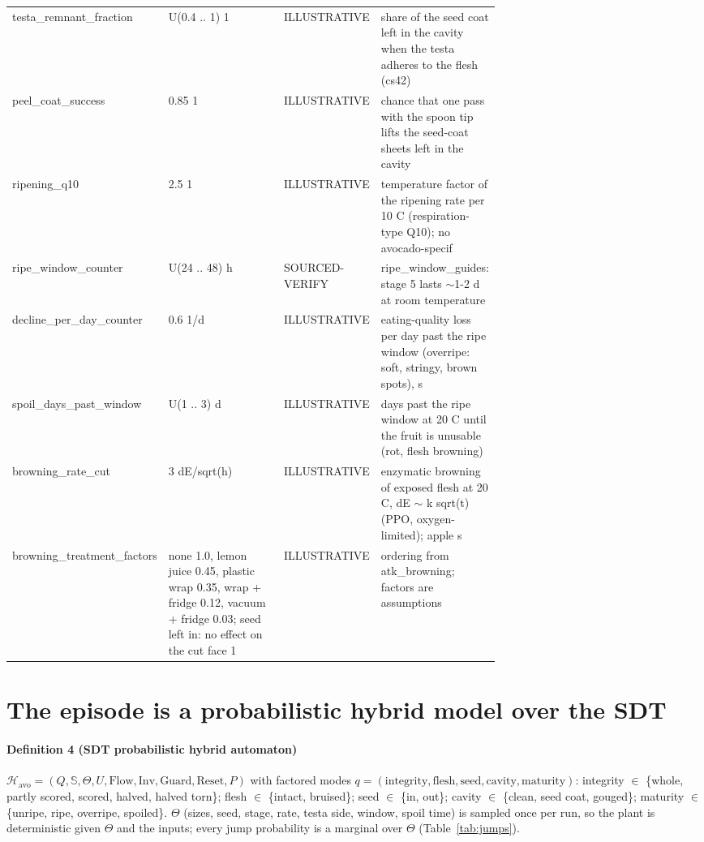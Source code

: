 \documentclass[10.5pt,a4paper]{article}
\begin{document}
\begin{table}[htbp]
\begin{tabularx}{\linewidth}{@{}p{0.25\linewidth}p{0.32\linewidth}p{0.13\linewidth}X@{}}
testa\_remnant\_fraction & U(0.4 .. 1) 1 & ILLUSTRATIVE & share of the seed coat left in the cavity when the testa adheres to the flesh (cs42) \\
peel\_coat\_success & 0.85 1 & ILLUSTRATIVE & chance that one pass with the spoon tip lifts the seed-coat sheets left in the cavity \\
ripening\_q10 & 2.5 1 & ILLUSTRATIVE & temperature factor of the ripening rate per 10 C (respiration-type Q10); no avocado-specif \\
ripe\_window\_counter & U(24 .. 48) h & SOURCED-VERIFY & ripe\_window\_guides: stage 5 lasts $\sim$1-2 d at room temperature \\
decline\_per\_day\_counter & 0.6 1/d & ILLUSTRATIVE & eating-quality loss per day past the ripe window (overripe: soft, stringy, brown spots), s \\
spoil\_days\_past\_window & U(1 .. 3) d & ILLUSTRATIVE & days past the ripe window at 20 C until the fruit is unusable (rot, flesh browning) \\
browning\_rate\_cut & 3 dE/sqrt(h) & ILLUSTRATIVE & enzymatic browning of exposed flesh at 20 C, dE $\sim$ k sqrt(t) (PPO, oxygen-limited); apple s \\
browning\_treatment\_factors & none 1.0, lemon juice 0.45, plastic wrap 0.35, wrap + fridge 0.12, vacuum + fridge 0.03; seed left in: no effect on the cut face 1 & ILLUSTRATIVE & ordering from atk\_browning; factors are assumptions \\\bottomrule\end{tabularx}\end{table}
\section{The episode is a probabilistic hybrid model over the SDT}
\paragraph{Definition 4 (SDT probabilistic hybrid automaton)} $\mathcal{H}_\text{avo}=(Q,\mathbb{S},\Theta,U,
\text{Flow},\text{Inv},\text{Guard},\text{Reset},P)$ with factored modes $q=(\text{integrity},\text{flesh},
\text{seed},\text{cavity},\text{maturity})$: integrity $\in$ \{whole, partly scored, scored, halved, halved torn\};
flesh $\in$ \{intact, bruised\}; seed $\in$ \{in, out\}; cavity $\in$ \{clean, seed coat, gouged\}; maturity $\in$
\{unripe, ripe, overripe, spoiled\}. $\Theta$ (sizes, seed, stage, rate, testa side, window, spoil time) is sampled
once per run, so the plant is deterministic given $\Theta$ and the inputs; every jump probability is a marginal over
$\Theta$ (Table~\ref{tab:jumps}).
\end{document}
